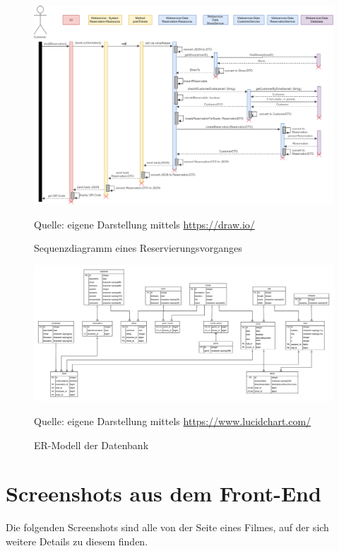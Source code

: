 \begin{figure}
	\centering
	\includegraphics[keepaspectratio, width=\textwidth, height=\textheight]{img/sequenzdiagramm_reservation}
	\captionsetup{format=hang}
	\caption{Sequenzdiagramm eines Reservierungsvorganges}
	\small Quelle: eigene Darstellung mittels \url{https://draw.io/} 
	\label{fig:Anhang_seq_reservieren}
\end{figure}

\begin{figure}
	\centering
	\includegraphics[keepaspectratio, width=\textwidth, height=\textheight]{img/ER-Modell}
	\captionsetup{format=hang}
	\caption{\acs{ER-Modell} der Datenbank}
	\small Quelle: eigene Darstellung mittels \url{https://www.lucidchart.com/}
	\label{fig:Anhang_ER-Modell}
\end{figure}

\chapter{Screenshots aus dem Front-End}
\label{sec:screenshots_frontend}
Die folgenden Screenshots sind alle von der Seite eines Filmes, auf der sich weitere Details zu diesem finden.


